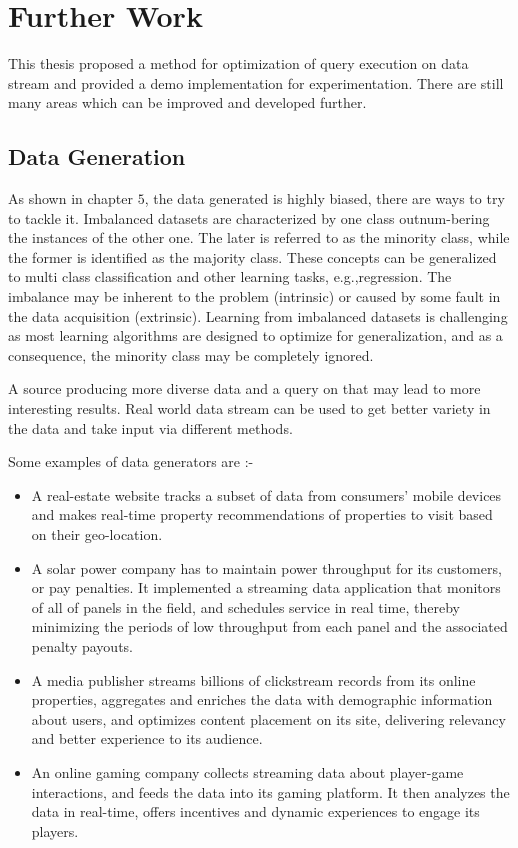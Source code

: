 \section{Further Work}
This thesis proposed a method for optimization of query execution on data stream and provided a demo implementation for experimentation. There are still many areas which can be improved and developed further.

\subsection{Data Generation}
As shown in chapter $5$, the data generated is highly biased, there are ways to try to tackle it\cite{Losing2018IncrementalOL}. \cite{DNN_for_stream} Imbalanced datasets are characterized by one class outnum-bering the instances of the other one. The later is referred to as the minority class, while the former is identified as  the  majority class. These concepts can be generalized to  multi class classification  and  other  learning  tasks,  e.g.,regression.  The  imbalance  may  be  inherent  to  the problem (intrinsic) or caused by some fault in the data acquisition (extrinsic).  Learning from imbalanced datasets is challenging as most learning algorithms are designed to optimize for generalization, and as a consequence, the minority class may be completely ignored.
\par A source producing more diverse data and a query on that may lead to more interesting results. Real world data stream can be used to get better variety in the data and take input via different methods.
\par Some examples of data generators are :-
\begin{itemize}
    \item A real-estate website tracks a subset of data from consumers’ mobile devices and makes real-time property recommendations of properties to visit based on their geo-location.\cite{data_source}
    \item A solar power company has to maintain power throughput for its customers, or pay penalties. It implemented a streaming data application that monitors of all of panels in the field, and schedules service in real time, thereby minimizing the periods of low throughput from each panel and the associated penalty payouts. \cite{data_source}
    \item A media publisher streams billions of clickstream records from its online properties, aggregates and enriches the data with demographic information about users, and optimizes content placement on its site, delivering relevancy and better experience to its audience.\cite{data_source}
    \item An online gaming company collects streaming data about player-game interactions, and feeds the data into its gaming platform. It then analyzes the data in real-time, offers incentives and dynamic experiences to engage its players.\cite{data_source}
\end{itemize}

